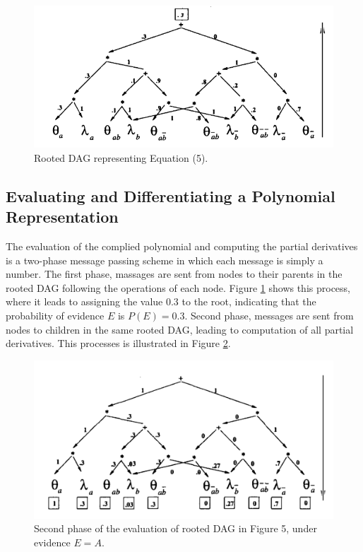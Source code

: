 \documentclass[twoside,11pt]{article}
\begin{document}
\begin{figure}[!htb]
    \begin{center}
    	\includegraphics[width=\columnwidth]{figures/compiled.png}
		\caption{Rooted DAG representing Equation (5).}
		\label{fig:comp}
    \end{center}
\end{figure}


\subsection{Evaluating and Differentiating a Polynomial Representation}

The evaluation of the complied polynomial and computing the partial derivatives is a two-phase message passing scheme in which each message is simply a number.
The first phase, massages are sent from nodes to their parents in the rooted DAG following the operations of each node.
Figure \ref{fig:comp} shows this process, where it leads to assigning the value 0.3 to the root, indicating that the probability of evidence $E$ is $P(E) = 0.3$.
Second phase, messages are sent from nodes to children in the same rooted DAG, leading to computation of all partial derivatives.
This processes is illustrated in Figure \ref{fig:deri}.

\begin{figure}[!htb]
    \begin{center}
    	\includegraphics[width=\columnwidth]{figures/deriv.png}
		\caption{Second phase of the evaluation of rooted DAG in Figure 5, under evidence $E=A$.}
		\label{fig:deri}
    \end{center}
\end{figure}
\end{document}
